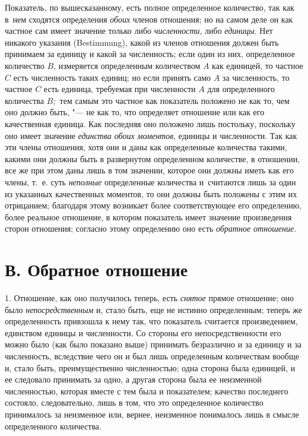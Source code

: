 Показатель, по вышесказанному, есть полное определенное количество, так как
в~нем сходятся определения {\em обоих} членов отношения; но на самом деле он
как частное сам имеет значение только либо {\em численности}, либо
{\em единицы}. Нет никакого указания (Bestimmung), какой из членов отношения
должен быть принимаем за единицу и какой за численность; если один из них,
определенное количество $B$, измеряется определенным количеством $A$ как
единицей, то частное $C$ есть численность таких единиц; но если принять само
$A$ за численность, то частное $C$ есть единица, требуемая при численности $A$
для определенного количества $B${\em ;\,} тем самым это частное как показатель
положено не как то, чем оно должно быть, "--- не как то, что определяет
отношение или как его качественная единица. Как последняя оно положено лишь
постольку, поскольку оно имеет значение {\em единства обоих моментов}, единицы
и численности. Так как эти члены отношения, хотя они и даны как определенные
количества такими, какими они должны быть в развернутом определенном
количестве, в отношении, все же при этом даны лишь в том значении, которое они
должны иметь как его члены, т.~е. суть {\em неполные} определенные количества
и~считаются лишь за один из указанных качественных моментов, то они должны быть
положены с этим их отрицанием; благодаря этому возникает более соответствующее
его определению, более реальное отношение, в котором показатель имеет значение
произведения сторон отношения; согласно этому определению оно есть
{\em обратное отношение}.

\section[В. Обратное отношение]{В. Обратное отношение}

1. Отношение, как оно получилось теперь, есть {\em снятое} прямое отношение;
оно было {\em непосредственным} и, стало быть, еще не истинно определенным;
теперь же определенность привзошла к нему так, что показатель считается
произведением, единством единицы и численности. Со стороны его
непосредственности его можно было (как было показано выше) принимать
безразлично и за единицу и за численность, вследствие чего он и был лишь
определенным количествам вообще и, стало быть, преимущественно численностью;
одна сторона была единицей, и ее следовало принимать за одно, а другая сторона
была ее неизменной численностью, которая вместе с тем была и показателем;
качество последнего состояло, следовательно, лишь в том, что это определенное
количество принималось за неизменное или, вернее, неизменное понималось лишь в
смысле определенного количества.

